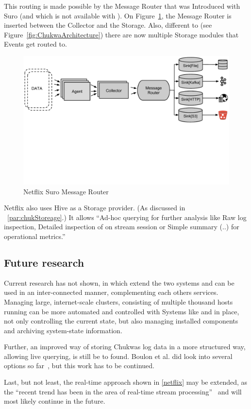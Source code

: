 This routing is made possible by the Message Router that was Introduced with Suro (and which is not available with \chuk). On Figure~\ref{fig:SuroMessageRouter}, the Message Router is inserted between the Collector and the Storage. Also, different to \chuk (see Figure~\ref{fig:ChukwaArchitecture}) there are now multiple Storage modules that Events get routed to.
\begin{figure}[hbt]
  \centering
  \includegraphics[width=\linewidth,clip=true,trim=0 75mm 0 0]{images/SuroMessageRouter}
  \caption{Netflix Suro Message Router~\cite{Bae2013}}
  \label{fig:SuroMessageRouter}
\end{figure}

Netflix also uses Hive as a Storage provider. (As discussed in ~\ref{par:chukStoreage}.) 
It allows ``Ad-hoc querying for further analysis like Raw log inspection, Detailed inspection of on stream session or Simple summary (..) for operational metrics.''~\cite{Tse2010}


\subsection{Future research}
Current research has not shown, in which extend the two systems \amblong and \chuk can be used in an inter-connected manner, complementing each others services. 
Managing large, internet-scale clusters, consisting of multiple thousand hosts running \hadooplong can be more automated and controlled with Systems like \amb and \chuk in place, not only controlling the current state, but also managing installed components and archiving system-state information.

Further, an improved way of storing Chukwas log data in a more structured way, allowing live querying, is still be to found. Boulon et al. did look into several options so far~\cite{Boulonb}, but this work has to be continued.

Last, but not least, the real-time approach shown in \ref{netflix} may be extended, as the ``recent trend has been in the area of real-time stream processing''~\cite{Bae2013} and will most likely continue in the future.